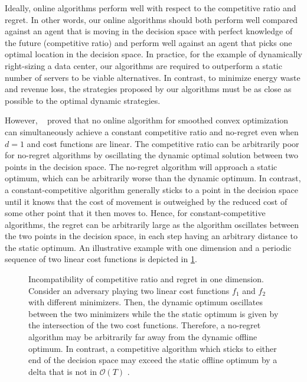 Ideally, online algorithms perform well with respect to the competitive ratio and regret. In other words, our online algorithms should both perform well compared against an agent that is moving in the decision space with perfect knowledge of the future (competitive ratio) and perform well against an agent that picks one optimal location in the decision space. In practice, for the example of dynamically right-sizing a data center, our algorithms are required to outperform a static number of servers to be viable alternatives. In contrast, to minimize energy waste and revenue loss, the strategies proposed by our algorithms must be as close as possible to the optimal dynamic strategies.

However, \citeauthor*{Andrew2015}~\cite{Andrew2015} proved that no online algorithm for smoothed convex optimization can simultaneously achieve a constant competitive ratio and no-regret even when $d = 1$ and cost functions are linear. The competitive ratio can be arbitrarily poor for no-regret algorithms by oscillating the dynamic optimal solution between two points in the decision space. The no-regret algorithm will approach a static optimum, which can be arbitrarily worse than the dynamic optimum. In contrast, a constant-competitive algorithm generally sticks to a point in the decision space until it knows that the cost of movement is outweighed by the reduced cost of some other point that it then moves to. Hence, for constant-competitive algorithms, the regret can be arbitrarily large as the algorithm oscillates between the two points in the decision space, in each step having an arbitrary distance to the static optimum. An illustrative example with one dimension and a periodic sequence of two linear cost functions is depicted in \cref{fig:incompatibility_of_competitive_ratio_and_regret}.

\begin{figure}
    \centering
    
    \caption{Incompatibility of competitive ratio and regret in one dimension. Consider an adversary playing two linear cost functions $f_1$ and $f_2$ with different minimizers. Then, the dynamic optimum oscillates between the two minimizers while the the static optimum is given by the intersection of the two cost functions. Therefore, a no-regret algorithm may be arbitrarily far away from the dynamic offline optimum. In contrast, a competitive algorithm which sticks to either end of the decision space may exceed the static offline optimum by a delta that is not in $\mathcal{O}(T)$ \cite{Wierman2019}.}
    \label{fig:incompatibility_of_competitive_ratio_and_regret}
\end{figure}

